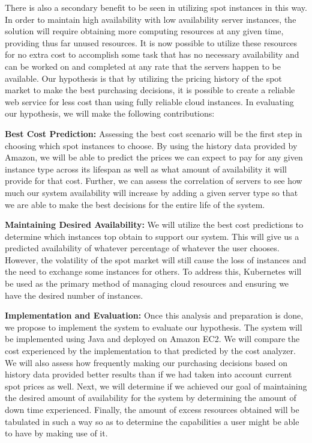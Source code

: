 \documentclass[thesis,proposal]{umassthesis}  %
\begin{document}
There is also a secondary benefit to be seen in utilizing spot instances in this way. In order to maintain high availability with low availability server instances, the solution will require obtaining more computing resources at any given time, providing thus far unused resources. It is now possible to utilize these resources for no extra cost to accomplish some task that has no necessary availability and can be worked on and completed at any rate that the servers happen to be available. Our hypothesis is that by utilizing the pricing history of the spot market to make the best purchasing decisions, it is possible to create a reliable web service for less cost than using fully reliable cloud instances. In evaluating our hypothesis, we will make the following contributions:\par

{\bf Best Cost Prediction:} Assessing the best cost scenario will be the first step in choosing which spot instances to choose. By using the history data provided by Amazon, we will be able to predict the prices we can expect to pay for any given instance type across its lifespan as well as what amount of availability it will provide for that cost. Further, we can assess the correlation of servers to see how much our system availability will increase by adding a given server type so that we are able to make the best decisions for the entire life of the system.

{\bf Maintaining Desired Availability:} We will utilize the best cost predictions to determine which instances top obtain to support our system. This will give us a predicted availability of whatever percentage of whatever the user chooses. However, the volatility of the spot market will still cause the loss of instances and the need to exchange some instances for others. To address this, Kubernetes will be used as the primary method of managing cloud resources and ensuring we have the desired number of instances.

{\bf Implementation and Evaluation:} Once this analysis and preparation is done, we propose to implement the system to evaluate our hypothesis. The system will be implemented using Java and deployed on Amazon EC2. We will compare the cost experienced by the implementation to that predicted by the cost analyzer. We will also assess how frequently making our purchasing decisions based on history data provided better results than if we had taken into account current spot prices as well. Next, we will determine if we achieved our goal of maintaining the desired amount of availability for the system by determining the amount of down time experienced. Finally, the amount of excess resources obtained will be tabulated in such a way so as to determine the capabilities a user might be able to have by making use of it.
\end{document}
